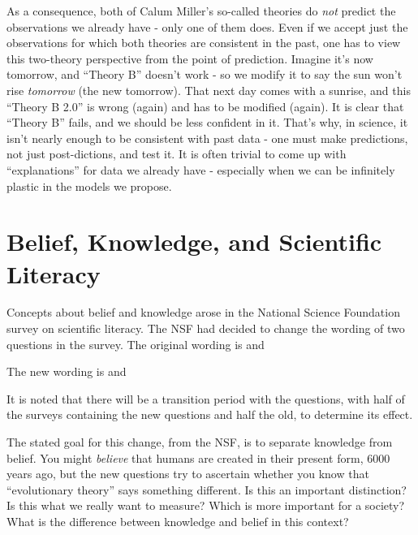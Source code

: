 As a consequence, both of Calum Miller's so-called theories do \emph{not}
predict the observations we already have - only one of them does. Even
if we accept just the observations for which both theories are
consistent in the past, one has to view this two-theory perspective from
the point of prediction. Imagine it's now tomorrow, and ``Theory B'' doesn't work - so we modify it to say the sun won't rise \emph{tomorrow} (the new tomorrow). That next day comes with a sunrise, and this ``Theory B 2.0'' is wrong (again) and has to be modified (again). It is clear that ``Theory B'' fails, and we should be less confident in it. That's why, in science, it isn't nearly enough to be consistent with past data - one must make predictions, not just post-dictions, and test it. It is often trivial to come up with ``explanations'' for data we already have - especially when we can be infinitely plastic in the models we propose. 



\section{Belief, Knowledge, and Scientific Literacy}

Concepts about belief and knowledge arose in the National Science Foundation survey on scientific literacy.  The NSF had decided to change the wording of two questions in the
survey. The original wording is 
 and 

 The new wording is  and 

 It is noted that there will be a transition period with the questions, with half of the surveys containing the new questions and half the old, to determine its effect.

The stated goal for this change, from the NSF, is to separate knowledge
from belief. You might \emph{believe} that humans are created in their
present form, 6000 years ago, but the new questions try to ascertain
whether you know that ``evolutionary theory'' says something different.
Is this an important distinction? Is this what we really want to
measure? Which is more important for a society? What is the difference
between knowledge and belief in this context?

